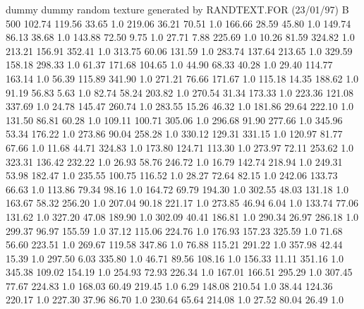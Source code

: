 dummy
dummy
random texture generated by RANDTEXT.FOR (23/01/97)
B   500
    102.74    119.56     33.65  1.0
    219.06     36.21     70.51  1.0
    166.66     28.59     45.80  1.0
    149.74     86.13     38.68  1.0
    143.88     72.50      9.75  1.0
     27.71      7.88    225.69  1.0
     10.26     81.59    324.82  1.0
    213.21    156.91    352.41  1.0
    313.75     60.06    131.59  1.0
    283.74    137.64    213.65  1.0
    329.59    158.18    298.33  1.0
     61.37    171.68    104.65  1.0
     44.90     68.33     40.28  1.0
     29.40    114.77    163.14  1.0
     56.39    115.89    341.90  1.0
    271.21     76.66    171.67  1.0
    115.18     14.35    188.62  1.0
     91.19     56.83      5.63  1.0
     82.74     58.24    203.82  1.0
    270.54     31.34    173.33  1.0
    223.36    121.08    337.69  1.0
     24.78    145.47    260.74  1.0
    283.55     15.26     46.32  1.0
    181.86     29.64    222.10  1.0
    131.50     86.81     60.28  1.0
    109.11    100.71    305.06  1.0
    296.68     91.90    277.66  1.0
    345.96     53.34    176.22  1.0
    273.86     90.04    258.28  1.0
    330.12    129.31    331.15  1.0
    120.97     81.77     67.66  1.0
     11.68     44.71    324.83  1.0
    173.80    124.71    113.30  1.0
    273.97     72.11    253.62  1.0
    323.31    136.42    232.22  1.0
     26.93     58.76    246.72  1.0
     16.79    142.74    218.94  1.0
    249.31     53.98    182.47  1.0
    235.55    100.75    116.52  1.0
     28.27     72.64     82.15  1.0
    242.06    133.73     66.63  1.0
    113.86     79.34     98.16  1.0
    164.72     69.79    194.30  1.0
    302.55     48.03    131.18  1.0
    163.67     58.32    256.20  1.0
    207.04     90.18    221.17  1.0
    273.85     46.94      6.04  1.0
    133.74     77.06    131.62  1.0
    327.20     47.08    189.90  1.0
    302.09     40.41    186.81  1.0
    290.34     26.97    286.18  1.0
    299.37     96.97    155.59  1.0
     37.12    115.06    224.76  1.0
    176.93    157.23    325.59  1.0
     71.68     56.60    223.51  1.0
    269.67    119.58    347.86  1.0
     76.88    115.21    291.22  1.0
    357.98     42.44     15.39  1.0
    297.50      6.03    335.80  1.0
     46.71     89.56    108.16  1.0
    156.33     11.11    351.16  1.0
    345.38    109.02    154.19  1.0
    254.93     72.93    226.34  1.0
    167.01    166.51    295.29  1.0
    307.45     77.67    224.83  1.0
    168.03     60.49    219.45  1.0
      6.29    148.08    210.54  1.0
     38.44    124.36    220.17  1.0
    227.30     37.96     86.70  1.0
    230.64     65.64    214.08  1.0
     27.52     80.04     26.49  1.0
